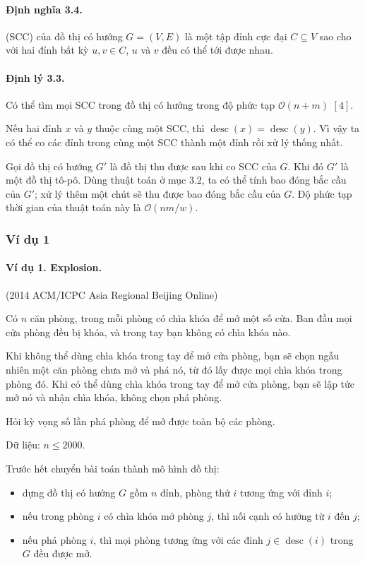 \documentclass[11pt]{article}
\newcommand{\Oh}{\mathcal{O}}
\begin{document}
\paragraph{Định nghĩa 3.4.}
 (SCC) của đồ thị có hướng \(G=(V,E)\) là
một tập đỉnh cực đại \(C\subseteq V\) sao cho với hai đỉnh bất kỳ
\(u,v\in C\), \(u\) và \(v\) đều có thể tới được nhau.

\paragraph{Định lý 3.3.}
Có thể tìm mọi SCC trong đồ thị có hướng trong độ phức tạp \(\Oh(n+m)\)
\([4]\).

Nếu hai đỉnh \(x\) và \(y\) thuộc cùng một SCC, thì
\(\operatorname{desc}(x)=\operatorname{desc}(y)\). Vì vậy ta có thể co các
đỉnh trong cùng một SCC thành một đỉnh rồi xử lý thống nhất.

Gọi đồ thị có hướng \(G'\) là đồ thị thu được sau khi co SCC của \(G\). Khi đó
\(G'\) là một đồ thị tô-pô. Dùng thuật toán ở mục 3.2, ta có thể tính bao đóng
bắc cầu của \(G'\); xử lý thêm một chút sẽ thu được bao đóng bắc cầu của \(G\).
Độ phức tạp thời gian của thuật toán này là \(\Oh(nm/w)\).

\subsubsection{Ví dụ 1}

\paragraph{Ví dụ 1. Explosion.}
(2014 ACM/ICPC Asia Regional Beijing Online)

Có \(n\) căn phòng, trong mỗi phòng có chìa khóa để mở một số cửa. Ban đầu mọi
cửa phòng đều bị khóa, và trong tay bạn không có chìa khóa nào.

Khi không thể dùng chìa khóa trong tay để mở cửa phòng, bạn sẽ chọn ngẫu nhiên
một căn phòng chưa mở và phá nó, từ đó lấy được mọi chìa khóa trong phòng đó.
Khi có thể dùng chìa khóa trong tay để mở cửa phòng, bạn sẽ lập tức mở nó và
nhận chìa khóa, không chọn phá phòng.

Hỏi kỳ vọng số lần phá phòng để mở được toàn bộ các phòng.

Dữ liệu: \(n\le 2000\).

Trước hết chuyển bài toán thành mô hình đồ thị:
\begin{itemize}
  \item dựng đồ thị có hướng \(G\) gồm \(n\) đỉnh, phòng thứ \(i\) tương ứng
  với đỉnh \(i\);

  \item nếu trong phòng \(i\) có chìa khóa mở phòng \(j\), thì nối cạnh có
  hướng từ \(i\) đến \(j\);

  \item nếu phá phòng \(i\), thì mọi phòng tương ứng với các đỉnh
  \(j\in\operatorname{desc}(i)\) trong \(G\) đều được mở.
\end{itemize}
\end{document}
